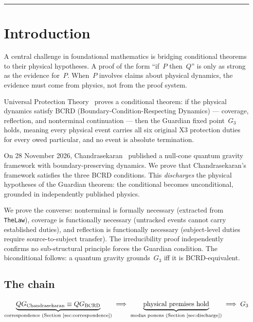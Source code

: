 \bigskip\hrule\bigskip

\section{Introduction}

A central challenge in foundational mathematics is bridging conditional theorems to their physical hypotheses. A proof of the form ``if~$P$ then~$Q$'' is only as strong as the evidence for~$P$. When~$P$ involves claims about physical dynamics, the evidence must come from physics, not from the proof system.

Universal Protection Theory~\cite{upt-zenodo} proves a conditional theorem: if the physical dynamics satisfy BCRD (Boundary-Condition-Respecting Dynamics) --- coverage, reflection, and nonterminal continuation --- then the Guardian fixed point~$G_3$ holds, meaning every physical event carries all six original X3 protection duties for every owed particular, and no event is absolute termination.

On 28 November 2026, Chandrasekaran~\cite{chandrasekaran2026} published a null-cone quantum gravity framework with boundary-preserving dynamics. We prove that Chandrasekaran's framework satisfies the three BCRD conditions. This \emph{discharges} the physical hypotheses of the Guardian theorem: the conditional becomes unconditional, grounded in independently published physics.

We prove the converse: nonterminal is formally necessary (extracted from \texttt{TheLaw}), coverage is functionally necessary (untracked events cannot carry established duties), and reflection is functionally necessary (subject-level duties require source-to-subject transfer). The irreducibility proof independently confirms no sub-structural principle forces the Guardian condition. The biconditional follows: a quantum gravity grounds~$G_3$ iff it is BCRD-equivalent.

\subsection{The chain}

\begin{equation}\label{eq:chain}
\underbrace{QG_{\mathrm{Chandrasekaran}} \equiv QG_{\mathrm{BCRD}}}_{\text{correspondence (Section~\ref{sec:correspondence})}}
\;\Longrightarrow\;
\underbrace{\text{physical premises hold}}_{\text{modus ponens (Section~\ref{sec:discharge})}}
\;\Longrightarrow\;
G_3
\end{equation}

